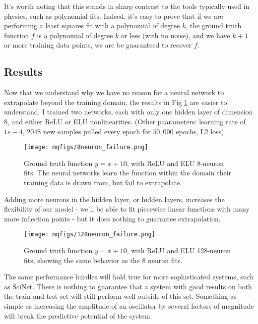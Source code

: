 \documentclass[aps,prl,preprint,groupedaddress]{revtex4-1}
\begin{document}
It's worth noting that this stands in sharp contrast to the tools typically used in physics, such as polynomial fits. Indeed, it's easy to prove that if we are performing a least squares fit with a polynomial of degree $k$, the ground truth function $f$ is a polynomial of degree $k$ or less (with no noise), and we have $k+1$ or more training data points, we are be guaranteed to recover $f$.

\subsection{Results}

Now that we understand why we have no reason for a neural network to extrapolate beyond the training domain, the results in Fig \ref{fail8} are easier to understand. I trained two networks, each with only one hidden layer of dimension $8$, and either ReLU or ELU nonlinearities. (Other paarameters: learning rate of $1e-4$, $2048$ new samples pulled every epoch for $50,000$ epochs, L2 loss).

\begin{figure}[h]
   \centering
   \texttt{[image: mqfigs/8neuron\_failure.png]}
   \caption{\label{fail8} Ground truth function $y = x + 10$, with ReLU and ELU 8-neuron fits. The neural networks learn the function within the domain their training data is drawn from, but fail to extrapolate.}
\end{figure}

Adding more neurons in the hidden layer, or hidden layers, increases the flexibility of our model - we'll be able to fit piecewise linear functions with many more inflection points - but it does nothing to guarantee extrapolation.

\begin{figure}[h]
   \centering
   \texttt{[image: mqfigs/128neuron\_failure.png]}
   \caption{\label{fail128} Ground truth function $y = x + 10$, with ReLU and ELU 128-neuron fits, showing the same behavior as the 8 neuron fits.}
\end{figure}

The same performance hurdles will hold true for more sophisticated systems, such as SciNet. There is nothing to guarantee that a system with good results on both the train and test set will still perform well outside of this set. Something as simple as increasing the amplitude of an oscillator by several factors of magnitude will break the predictive potential of the system.
\end{document}
